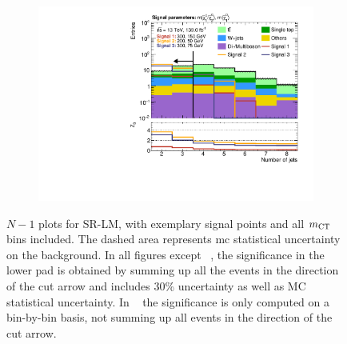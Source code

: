 \begin{figure}
\begin{subfigure}[b]{0.4\linewidth}
		\centering\includegraphics[width=\textwidth]{n1_SRLM_mct_bins/nJet30.pdf}
		\caption{\label{fig:Wh_reopt_second_round_n1_srlm_njet}}
	\end{subfigure}
	\caption{$N-1$ plots for SR-LM, with exemplary signal points and all $m_{\textrm{CT}}$ bins included. The dashed area represents \gls{mc} statistical uncertainty on the background. In all figures except \figname~, the significance in the lower pad is obtained by summing up all the events in the direction of the cut arrow and includes 30\% uncertainty as well as MC statistical uncertainty. In \figname~ the significance is only computed on a bin-by-bin basis, \ie not summing up all events in the direction of the cut arrow.}
	\label{fig:Wh_reopt_second_round_n1_srlm}
\end{figure}

